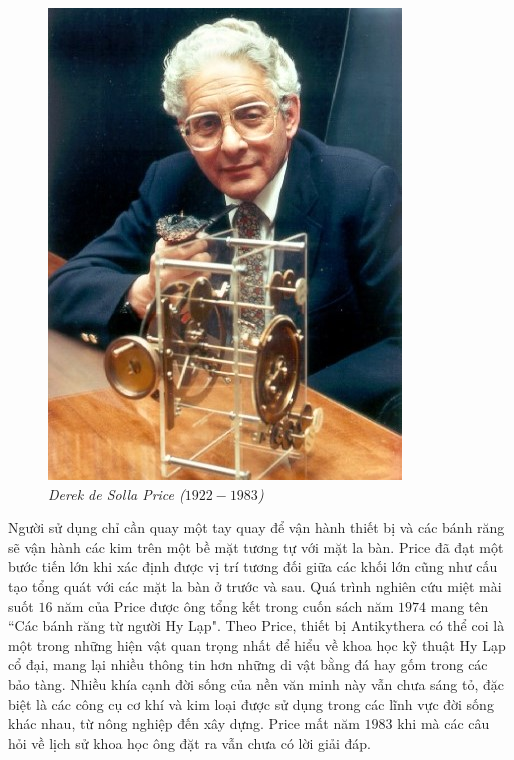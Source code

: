 \begin{multicols}{2}
\begin{figure}[H]
		\vspace*{-5pt}
		\centering
		\captionsetup{labelformat= empty, justification=centering}
		\includegraphics[width= 0.72\linewidth]{3}
		\caption{\small\textit{\color{lichsutoanhoc}Derek de Solla Price ($1922-1983$)}}
		\vspace*{-5pt}
	\end{figure}
	Người sử dụng chỉ cần quay một tay quay để vận hành thiết bị và các bánh răng sẽ vận hành các kim trên một bề mặt tương tự với mặt la bàn. Price đã đạt một bước tiến lớn khi xác định được vị trí tương đối giữa các khối lớn cũng như cấu tạo tổng quát với các mặt la bàn ở trước và sau. Quá trình nghiên cứu miệt mài suốt $16$ năm của Price được ông tổng kết trong cuốn sách năm $1974$ mang tên ``Các bánh răng từ người Hy Lạp". Theo Price, thiết bị Antikythera có thể coi là một trong những hiện vật quan trọng nhất để hiểu về khoa học kỹ thuật Hy Lạp cổ đại, mang lại nhiều thông tin hơn những di vật bằng đá hay gốm trong các bảo tàng. Nhiều khía cạnh đời sống của nền văn minh này vẫn chưa sáng tỏ, đặc biệt là các công cụ cơ khí và kim loại được sử dụng trong các lĩnh vực đời sống khác nhau, từ nông nghiệp đến xây dựng. Price mất năm $1983$ khi mà các câu hỏi về lịch sử khoa học ông đặt ra vẫn chưa có lời giải đáp. 
	\begin{figure}[H]
		\vspace*{-5pt}
		\centering
		\captionsetup{labelformat= empty, justification=centering}

\end{figure}
\end{multicols}
